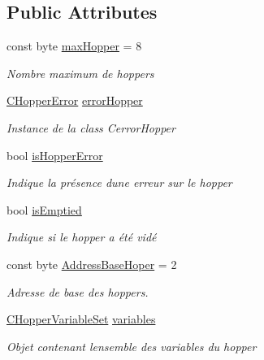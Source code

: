 \subsection*{Public Attributes}
\begin{DoxyCompactItemize}
\item 
const byte \mbox{\hyperlink{class_device_library_1_1_c_hopper_a109908437c130d0e5f081f13ab48c98c}{max\+Hopper}} = 8
\begin{DoxyCompactList}\small\item\em Nombre maximum de hoppers \end{DoxyCompactList}\item 
\mbox{\hyperlink{class_device_library_1_1_c_hopper_1_1_c_hopper_error}{C\+Hopper\+Error}} \mbox{\hyperlink{class_device_library_1_1_c_hopper_ad9d867e3315d21fea58b64b696fa8d17}{error\+Hopper}}
\begin{DoxyCompactList}\small\item\em Instance de la class Cerror\+Hopper \end{DoxyCompactList}\item 
bool \mbox{\hyperlink{class_device_library_1_1_c_hopper_a2489ae3898da396040859ec4c86bd3e0}{is\+Hopper\+Error}}
\begin{DoxyCompactList}\small\item\em Indique la présence d\textquotesingle{}une erreur sur le hopper \end{DoxyCompactList}\item 
bool \mbox{\hyperlink{class_device_library_1_1_c_hopper_a13463c888437b418637de1d7e2cd4231}{is\+Emptied}}
\begin{DoxyCompactList}\small\item\em Indique si le hopper a été vidé \end{DoxyCompactList}\item 
const byte \mbox{\hyperlink{class_device_library_1_1_c_hopper_a8d069f368b3dd2356d76b8244181168b}{Address\+Base\+Hoper}} = 2
\begin{DoxyCompactList}\small\item\em Adresse de base des hoppers. \end{DoxyCompactList}\item 
\mbox{\hyperlink{class_device_library_1_1_c_hopper_variable_set}{C\+Hopper\+Variable\+Set}} \mbox{\hyperlink{class_device_library_1_1_c_hopper_ab4e4002ee1d9863f6eaf3e67526d4c9a}{variables}}
\begin{DoxyCompactList}\small\item\em Objet contenant l\textquotesingle{}ensemble des variables du hopper \end{DoxyCompactList}\item 

\end{DoxyCompactItemize}
